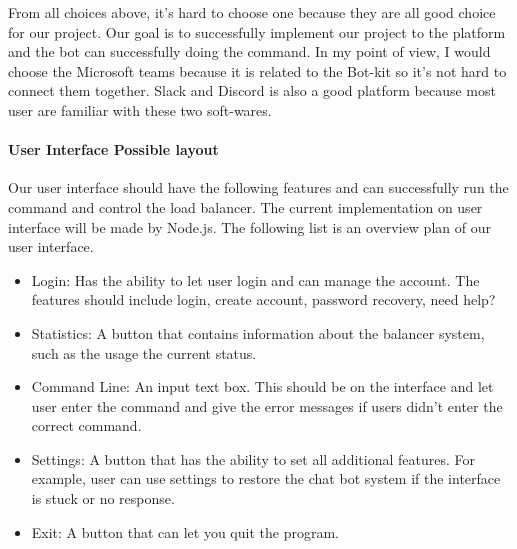 From all choices above, it's hard to choose one because they are all good choice for our project. Our goal is to successfully implement our project to the platform and the bot can successfully doing the command. In my point of view, I would choose the Microsoft teams because it is related to the Bot-kit so it's not hard to connect them together. Slack and Discord is also a good platform because most user are familiar with these two soft-wares. 


\paragraph{User Interface Possible layout}
Our user interface should have the following features and can successfully run the command and control the load balancer.
The current implementation on user interface will be made by Node.js. The following list is an overview plan of our user interface.
\begin{itemize}
    \item Login: Has the ability to let user login and can manage the account. The features should include login, create account, password recovery, need help?
   \item Statistics: A button that contains information about the balancer system, such as the usage the current status. 
   \item Command Line: An input text box. This should be on the interface and let user enter the command and give the error messages if users didn't enter the correct command.
    \item Settings: A button that has the ability to set all additional features. For example, user can use settings to restore the chat bot system if the interface is stuck or no response.
    \item Exit: A button that can let you quit the program.

\end{itemize}


